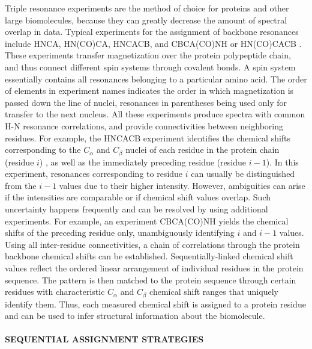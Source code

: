 \documentclass{article}
\begin{document}
Triple resonance experiments are the method of choice for proteins and other large biomolecules, because they can greatly decrease the amount of spectral overlap in data. Typical experiments for the assignment of backbone resonances include HNCA, HN(CO)CA, HNCACB, and CBCA(CO)NH or HN(CO)CACB \cite{mars}. These experiments transfer magnetization over the protein polypeptide chain, and thus connect different spin systems through covalent bonds. A spin system essentially contains all resonances belonging to a particular amino acid. The order of elements in experiment names indicates the order in which magnetization is passed down the line of nuclei, resonances in parentheses being used only for transfer to the next nucleus. All these experiments produce spectra with common H-N resonance correlations, and provide connectivities between neighboring residues. For example, the HNCACB experiment identifies the chemical shifts corresponding to the $C_\alpha$ and $C_\beta$ nuclei of each residue in the protein chain (residue $i$) , as well as the immediately preceding residue (residue $i-1$). In this experiment, resonances corresponding to residue $i$ can usually be distinguished from the $i-1$  values due to their higher intensity. However, ambiguities can arise if the intensities are comparable or if chemical shift values overlap. Such uncertainty happens frequently and can be resolved by using additional experiments. For example, an experiment CBCA(CO)NH yields the chemical shifts of the preceding residue only, unambiguously identifying $i$ and $i-1$  values. Using all inter-residue connectivities, a chain of correlations through the protein backbone chemical shifts can be established. Sequentially-linked chemical shift values reflect the ordered linear arrangement of individual residues in the protein sequence. The pattern is then matched to the protein sequence through certain residues with characteristic $C_\alpha$ and $C_\beta$ chemical shift ranges that uniquely identify them. Thus, each measured chemical shift is assigned to a protein residue and can be used to infer structural information about the biomolecule.
\\\\
\noindent \textbf{SEQUENTIAL ASSIGNMENT STRATEGIES}\\
\end{document}
